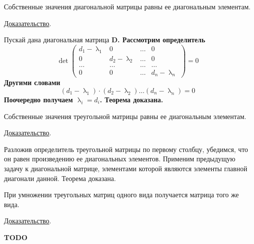 \begin{theorem}
    Собственные значения диагональной матрицы равны ее диагональным элементам.

    \underline{Доказательство}.
    \vspace{5pt}

    Пускай дана диагональная матрица \bf{D}. Рассмотрим определитель
    \begin{equation*}
        \det
        \begin{pmatrix}
            d_1 - \uplambda_1 & 0                 & \dots & 0                 \\
            0                 & d_2 - \uplambda_2 & \dots & 0                 \\
            \dots             & \dots             & \dots & \dots             \\
            0                 & 0                 & \dots & d_n - \uplambda_n
        \end{pmatrix}
        = 0
    \end{equation*}
    Другими словами
    \begin{equation*}
        \left( d_1 - \uplambda_1 \right) \cdot \left( d_2 - \uplambda_2 \right) \dots \left( d_n - \uplambda_n \right) = 0
    \end{equation*}
    Поочередно получаем $\displaystyle \uplambda_i = d_i$. Теорема доказана.
\end{theorem}

\begin{theorem}
    Собственные значения треугольной матрицы равны ее диагональным элементам.

    \underline{Доказательство}.
    \vspace{5pt}

    Разложив определитель треугольной матрицы по первому столбцу, убедимся, что он равен произведению ее диагональных элементов.
    Применим предыдущую задачу к диагональной матрице, элементами которой являются элементы главной диагонали данной.
    Теорема доказана.
\end{theorem}

\begin{theorem}
    При умножении треугольных матриц одного вида получается матрица того же вида.

    \underline{Доказательство}.
    \vspace{5pt}

    \bf{TODO}
\end{theorem}

